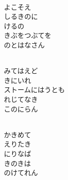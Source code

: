 \documentclass[10pt,b5j]{tarticle} %
\begin{document}
\begin{enumerate}
\begin{minipage}[c]{\blocksize}
    \end{minipage}
    \begin{minipage}[c]{\blocksize}
        
        \vspace{\linespace}
        \item~\\
        よこそえ\\
        しるきのに\\
        けるの\\
        きぶをつぶてを\\
        のとはなさん
        
    \end{minipage}
    \begin{minipage}[c]{\blocksize}
        
        \vspace{\linespace}
        \item~\\
        みてはえど\\
        きにいれ\\
        ストームにはうとも\\
        れじてなき\\
        このにらん
        
    \end{minipage}
    \begin{minipage}[c]{\blocksize}
        
        \vspace{\linespace}
        \item~\\
        かきめて\\
        えりたき\\
        にりなば\\
        きのきは\\
        のけてれん
    
    \end{minipage}
\end{enumerate} %
\end{document}
